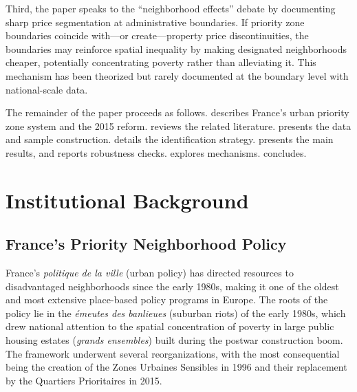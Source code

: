 \documentclass[12pt]{article}
\begin{document}
Third, the paper speaks to the ``neighborhood effects'' debate \citep{chetty2016effects, chyn2018moved} by documenting sharp price segmentation at administrative boundaries. If priority zone boundaries coincide with---or create---property price discontinuities, the boundaries may reinforce spatial inequality by making designated neighborhoods cheaper, potentially concentrating poverty rather than alleviating it. This mechanism has been theorized \citep{galster2012mechanism} but rarely documented at the boundary level with national-scale data.

The remainder of the paper proceeds as follows.  describes France's urban priority zone system and the 2015 reform.  reviews the related literature.  presents the data and sample construction.  details the identification strategy.  presents the main results, and  reports robustness checks.  explores mechanisms.  concludes.


\section{Institutional Background} \label{sec:background}

\subsection{France's Priority Neighborhood Policy}

France's \textit{politique de la ville} (urban policy) has directed resources to disadvantaged neighborhoods since the early 1980s, making it one of the oldest and most extensive place-based policy programs in Europe. The roots of the policy lie in the \textit{\'{e}meutes des banlieues} (suburban riots) of the early 1980s, which drew national attention to the spatial concentration of poverty in large public housing estates (\textit{grands ensembles}) built during the postwar construction boom. The framework underwent several reorganizations, with the most consequential being the creation of the Zones Urbaines Sensibles in 1996 and their replacement by the Quartiers Prioritaires in 2015.
\end{document}
